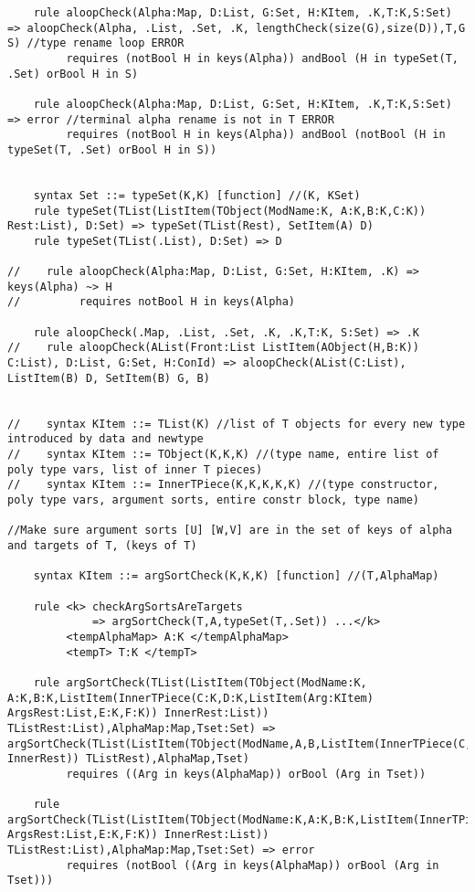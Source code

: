 \begin{lstlisting}
    rule aloopCheck(Alpha:Map, D:List, G:Set, H:KItem, .K,T:K,S:Set) => aloopCheck(Alpha, .List, .Set, .K, lengthCheck(size(G),size(D)),T,G S) //type rename loop ERROR
         requires (notBool H in keys(Alpha)) andBool (H in typeSet(T, .Set) orBool H in S) 

    rule aloopCheck(Alpha:Map, D:List, G:Set, H:KItem, .K,T:K,S:Set) => error //terminal alpha rename is not in T ERROR
         requires (notBool H in keys(Alpha)) andBool (notBool (H in typeSet(T, .Set) orBool H in S))


    syntax Set ::= typeSet(K,K) [function] //(K, KSet)
    rule typeSet(TList(ListItem(TObject(ModName:K, A:K,B:K,C:K)) Rest:List), D:Set) => typeSet(TList(Rest), SetItem(A) D)
    rule typeSet(TList(.List), D:Set) => D

//    rule aloopCheck(Alpha:Map, D:List, G:Set, H:KItem, .K) => keys(Alpha) ~> H
//         requires notBool H in keys(Alpha)

    rule aloopCheck(.Map, .List, .Set, .K, .K,T:K, S:Set) => .K
//    rule aloopCheck(AList(Front:List ListItem(AObject(H,B:K)) C:List), D:List, G:Set, H:ConId) => aloopCheck(AList(C:List), ListItem(B) D, SetItem(B) G, B)


//    syntax KItem ::= TList(K) //list of T objects for every new type introduced by data and newtype
//    syntax KItem ::= TObject(K,K,K) //(type name, entire list of poly type vars, list of inner T pieces)
//    syntax KItem ::= InnerTPiece(K,K,K,K,K) //(type constructor, poly type vars, argument sorts, entire constr block, type name)

//Make sure argument sorts [U] [W,V] are in the set of keys of alpha and targets of T, (keys of T)

    syntax KItem ::= argSortCheck(K,K,K) [function] //(T,AlphaMap)

    rule <k> checkArgSortsAreTargets
             => argSortCheck(T,A,typeSet(T,.Set)) ...</k>
         <tempAlphaMap> A:K </tempAlphaMap>
         <tempT> T:K </tempT>
    
    rule argSortCheck(TList(ListItem(TObject(ModName:K, A:K,B:K,ListItem(InnerTPiece(C:K,D:K,ListItem(Arg:KItem) ArgsRest:List,E:K,F:K)) InnerRest:List)) TListRest:List),AlphaMap:Map,Tset:Set) => argSortCheck(TList(ListItem(TObject(ModName,A,B,ListItem(InnerTPiece(C,D,ArgsRest,E,F)) InnerRest)) TListRest),AlphaMap,Tset)
         requires ((Arg in keys(AlphaMap)) orBool (Arg in Tset))

    rule argSortCheck(TList(ListItem(TObject(ModName:K,A:K,B:K,ListItem(InnerTPiece(C:K,D:K,ListItem(Arg:KItem) ArgsRest:List,E:K,F:K)) InnerRest:List)) TListRest:List),AlphaMap:Map,Tset:Set) => error
         requires (notBool ((Arg in keys(AlphaMap)) orBool (Arg in Tset)))


\end{lstlisting}
